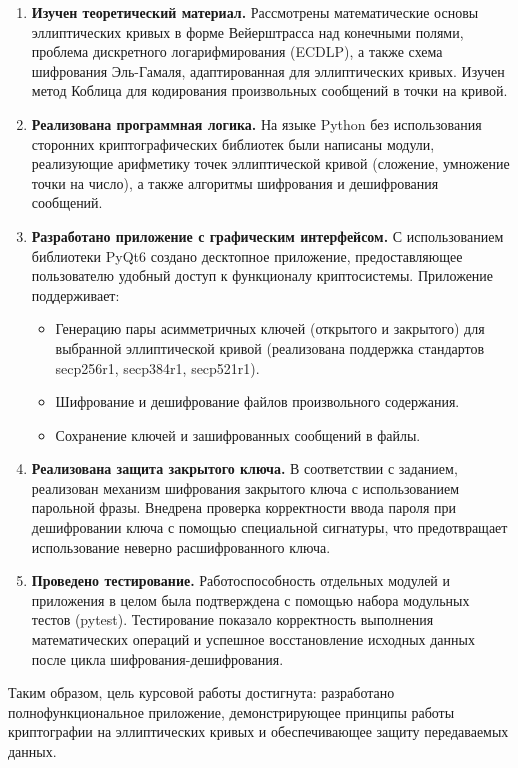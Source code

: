 \begin{enumerate}
	\item \textbf{Изучен теоретический материал.} Рассмотрены математические основы эллиптических кривых в форме Вейерштрасса над конечными полями, проблема дискретного логарифмирования (ECDLP), а также схема шифрования Эль-Гамаля, адаптированная для эллиптических кривых. Изучен метод Коблица для кодирования произвольных сообщений в точки на кривой.
	
	\item \textbf{Реализована программная логика.} На языке Python без использования сторонних криптографических библиотек были написаны модули, реализующие арифметику точек эллиптической кривой (сложение, умножение точки на число), а также алгоритмы шифрования и дешифрования сообщений.
	
	\item \textbf{Разработано приложение с графическим интерфейсом.} С использованием библиотеки PyQt6 создано десктопное приложение, предоставляющее пользователю удобный доступ к функционалу криптосистемы. Приложение поддерживает:
	
	\begin{itemize}
		\item Генерацию пары асимметричных ключей (открытого и закрытого) для выбранной эллиптической кривой (реализована поддержка стандартов secp256r1, secp384r1, secp521r1).
	
		\item Шифрование и дешифрование файлов произвольного содержания.
	
		\item Сохранение ключей и зашифрованных сообщений в файлы.
	\end{itemize}
	
	\item \textbf{Реализована защита закрытого ключа.} В соответствии с заданием, реализован механизм шифрования закрытого ключа с использованием парольной фразы. Внедрена проверка корректности ввода пароля при дешифровании ключа с помощью специальной сигнатуры, что предотвращает использование неверно расшифрованного ключа.
	
	\item \textbf{Проведено тестирование.} Работоспособность отдельных модулей и приложения в целом была подтверждена с помощью набора модульных тестов (pytest). Тестирование показало корректность выполнения математических операций и успешное восстановление исходных данных после цикла шифрования-дешифрования.
\end{enumerate}

Таким образом, цель курсовой работы достигнута: разработано полнофункциональное приложение, демонстрирующее принципы работы криптографии на эллиптических кривых и обеспечивающее защиту передаваемых данных.

\newpage
{}
{}
\nocite{washington2008elliptic}
\nocite{hankerson2006guide}
\nocite{neuromancer_std_curves}






